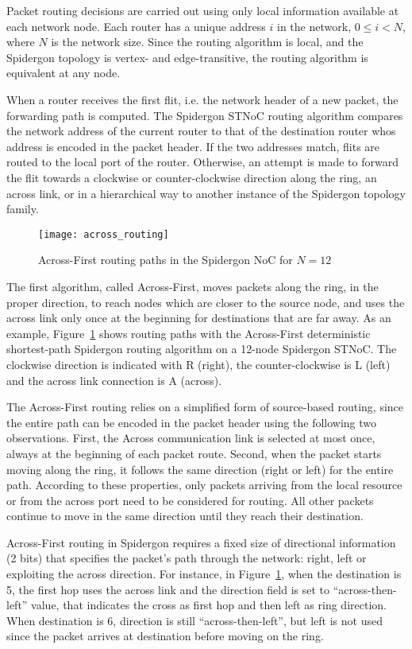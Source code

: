 Packet routing decisions are carried out using only local information available at each network node. Each router has a unique address ${i}$ in the network, ${0 \le i < N}$, where ${N}$ is the network size. Since the routing algorithm is local, and the Spidergon topology is vertex- and edge-transitive, the routing algorithm is equivalent at any node.

When a router receives the first flit, i.e. the network header of a new packet, the forwarding path is computed. 
The Spidergon STNoC routing algorithm compares the network address of the current router to that of the destination router whos address is encoded in the packet header. 
If the two addresses match, flits are routed to the local port of the router. 
Otherwise, an attempt is made to forward the flit towards a clockwise or counter-clockwise direction along the ring, an across link, or in a hierarchical way to another instance of the Spidergon topology family.

	\begin{figure}[ht]
	\centering
		\texttt{[image: across\_routing]}
		\caption{Across-First routing paths in the Spidergon NoC for ${N = 12}$}
		\label{fig:routing1}
	\end{figure}

The first algorithm, called Across-First, moves packets along the ring, in the proper direction, to reach nodes which are closer to the source node, and uses the across link only once at the beginning for destinations that are far away. 
As an example, Figure~\ref{fig:routing1} shows routing paths with the Across-First deterministic shortest-path Spidergon routing algorithm on a 12-node Spidergon STNoC. 
The clockwise direction is indicated with R (right), the counter-clockwise is L (left) and the across link connection is A (across). 

The Across-First routing relies on a simplified form of source-based routing, since the entire path can be encoded in the packet header using the following two observations. 
First, the Across communication link is selected at most once, always at the beginning of each packet route. 
Second, when the packet starts moving along the ring, it follows the same direction (right or left) for the entire path. 
According to these properties, only packets arriving from the local resource or from the across port need to be considered for routing. 
All other packets continue to move in the same direction until they reach their destination.

Across-First routing in Spidergon requires a fixed size of directional information (2 bits) that specifies the packet’s path through the network: right, left or exploiting the across direction. 
For instance, in Figure~\ref{fig:routing1}, when the destination is 5, the first hop uses the across link and the direction field is set to “across-then-left” value, that indicates the cross as first hop and then left as ring direction. 
When destination is 6, direction is still “across-then-left”, but left is not used since the packet arrives at destination before moving on the ring.

